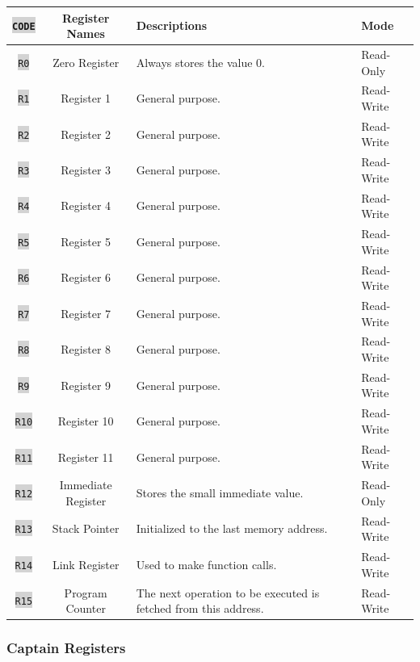 \documentclass{article}
\newcommand{\vnscode}[1]{\colorbox{lightgray}{\lstinline[language=vns]{#1}}}
\begin{document}
\begin{minipage}{\textwidth}
\centering
\begin{tabular}{|c|c|l|l|}
    \hline \vnscode{CODE} & Register Names & Descriptions & Mode \\ \hline
    \vnscode{R0} & Zero Register & Always stores the value 0. & Read-Only \\ \hline
    \vnscode{R1} & Register 1 & General purpose. & Read-Write \\ \hline
    \vnscode{R2} & Register 2 & General purpose. & Read-Write \\ \hline
    \vnscode{R3} & Register 3 & General purpose. & Read-Write \\ \hline
    \vnscode{R4} & Register 4 & General purpose. & Read-Write \\ \hline
    \vnscode{R5} & Register 5 & General purpose. & Read-Write \\ \hline
    \vnscode{R6} & Register 6 & General purpose. & Read-Write \\ \hline
    \vnscode{R7} & Register 7 & General purpose. & Read-Write \\ \hline
    \vnscode{R8} & Register 8 & General purpose. & Read-Write \\ \hline
    \vnscode{R9} & Register 9 & General purpose. & Read-Write \\ \hline
    \vnscode{R10} & Register 10 & General purpose. & Read-Write \\ \hline
    \vnscode{R11} & Register 11 & General purpose. & Read-Write \\ \hline
    \vnscode{R12} & Immediate Register & Stores the small immediate value. & Read-Only \\ \hline
    \vnscode{R13} & Stack Pointer & Initialized to the last memory address. & Read-Write \\ \hline
    \vnscode{R14} & Link Register & Used to make function calls. & Read-Write \\ \hline
    \vnscode{R15} & Program Counter & The next operation to be executed is fetched from this address. & Read-Write \\ \hline
\end{tabular}
\end{minipage}

\subsubsection{Captain Registers}
\end{document}
